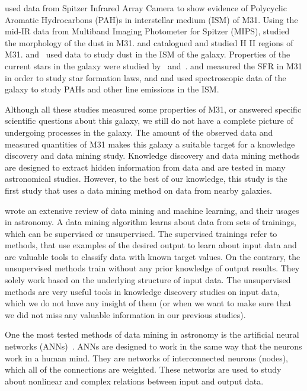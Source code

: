 \cite{Barmby06} used data from Spitzer Infrared Array Camera \citep[IRAC;][]{Fazio04} to show evidence of Polycyclic Aromatic Hydrocarbons (PAH)s in interstellar medium (ISM) of M31.
Using the mid-IR data from Multiband Imaging Photometer for Spitzer (MIPS), \cite{Gordon06} studied the morphology of the dust in M31.
\cite{Azimlu11} and \cite{Sanders12} catalogued and studied H {\sc II} regions of M31.
\cite{Draine14, Mattsson14, Viaene14, Smith12} and~\cite{Fritz12} used \Herschel data to study dust in the ISM of the galaxy.
Properties of the current stars in the galaxy were studied by~\cite{Tamm12} and~\cite{Massey07}. %
\cite{Rahmani16, Ford13} and \cite{Tabatabaei10} measured the SFR in M31 in order to study star formation laws, and \cite{Dim15} and \cite{Kapala15} used spectroscopic data of the galaxy to study PAHs and other line emissions in the ISM.

Although all these studies measured some properties of M31, or answered specific scientific questions about this galaxy, we still do not have a complete picture of undergoing processes in the galaxy.
The amount of the observed data and measured quantities of M31 makes this galaxy a suitable target for a knowledge discovery and data mining study.
Knowledge discovery and data mining methods are designed to extract hidden information from data and are tested in many astronomical studies.
However, to the best of our knowledge, this study is the first study that uses a data mining method on data from nearby galaxies. %

\cite{Ball10} wrote an extensive review of data mining and machine learning, and their usages in astronomy.
A data mining algorithm learns about data from sets of trainings, which can be supervised or unsupervised.
The supervised trainings refer to methods, that use examples of the desired output to learn about input data and are valuable tools to classify data with known target values.
On the contrary, the unsupervised methods train without any prior knowledge of output results. 
They solely work based on the underlying structure of input data.   
The unsupervised methods are very useful tools in knowledge discovery studies on input data, which we do not have any insight of them (or when we want to make sure that we did not miss any valuable information in our previous studies). %

One the most tested methods of data mining in astronomy is the artificial neural networks (ANNs)~\citep[e.g.][and references therein]{Hossein12, Hossein14,Hossein16,Ellison16a}.
ANNs are designed to work in the same way that the neurons work in a human mind.
They are networks of interconnected neurons (nodes), which all of the connections are weighted.
These networks are used to study about nonlinear and complex relations between input and output data.

